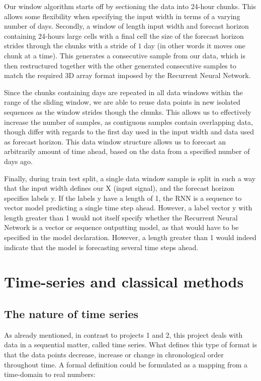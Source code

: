 \documentclass
[twocolumn,
secnumarabic,
nobibnotes,
aps,
prl,
reprint,
groupedaddress,
amsmath,
amssymb,
]{revtex4-2}
\begin{document}
Our window algorithm starts off by sectioning the data into 24-hour chunks. This allows some flexibility when specifying the input width in terms of a varying number of days. Secondly, a window of length input width and forecast horizon containing 24-hours large cells with a final cell the size of the forecast horizon strides through the chunks with a stride of $1$ day (in other words it moves one chunk at a time). This generates a consecutive sample from our data, which is then restructured together with the other generated consecutive samples to match the required 3D array format imposed by the Recurrent Neural Network.

Since the chunks containing days are repeated in all data windows within the range of the sliding window, we are able to reuse data points in new isolated sequences as the window strides though the chunks. This allows us to effectively increase the number of samples, as contiguous samples contain overlapping data, though differ with regards to the first day used in the input width and data used as forecast horizon. This data window structure allows us to forecast an arbitrarily amount of time ahead, based on the data from a specified number of days ago.

Finally, during train test split, a single data window sample is split in such a way that the input width defines our X (input signal), and the forecast horizon specifies labels y. If the labels y have a length of 1, the RNN is a sequence to vector model predicting a single time step ahead. However, a label vector y with length greater than 1 would not itself specify whether the Recurrent Neural Network is a vector or sequence outputting model, as that would have to be specified in the model declaration. However, a length greater than 1 would indeed indicate that the model is forecasting several time steps ahead. 


\section{Time-series and classical methods}

\subsection{The nature of time series}
As already mentioned, in contrast to projects 1 and 2, this project deals with data in a sequential matter, called time series. What defines this type of format is that the data points decrease, increase or change in chronological order throughout time\cite{Vishwas2020}.  A formal definition could be formulated as a mapping from a time-domain to real numbers:
\end{document}
